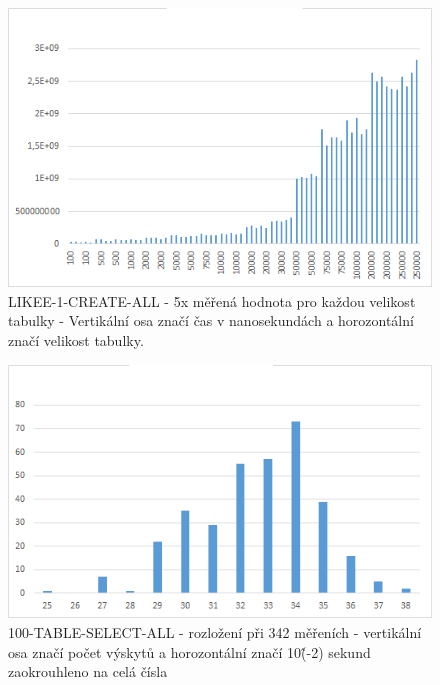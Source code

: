 \documentclass[a4paper, 11pt]{article}
\begin{document}
\begin{figure}[H]
\centering
\includegraphics[width=150mm]{images/LIKEE-1-CREATE-ALL.png}
\caption{LIKEE-1-CREATE-ALL - 5x měřená hodnota pro každou velikost tabulky - Vertikální osa značí čas v nanosekundách a horozontální značí velikost tabulky.}
\label{sec:obr1}
\end{figure}

\begin{figure}[H]
\centering
\includegraphics[width=150mm]{images/100-TABLE-SELECT-ALL-342.png}
\caption{100-TABLE-SELECT-ALL - rozložení při 342 měřeních - vertikální osa značí počet výskytů a horozontální značí 10\^(-2) sekund zaokrouhleno na celá čísla}
\label{sec:obr3}
\end{figure}
\end{document}
